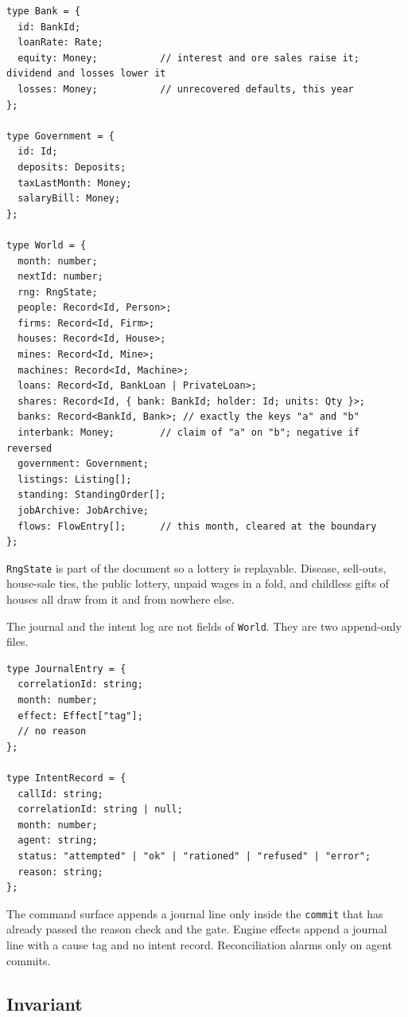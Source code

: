 \documentclass[11pt]{article}
\newenvironment{keep}{\noindent\begin{minipage}{\linewidth}}{\end{minipage}}
\begin{document}
\begin{keep}
\begin{lstlisting}
type Bank = {
  id: BankId;
  loanRate: Rate;
  equity: Money;           // interest and ore sales raise it; dividend and losses lower it
  losses: Money;           // unrecovered defaults, this year
};

type Government = {
  id: Id;
  deposits: Deposits;
  taxLastMonth: Money;
  salaryBill: Money;
};

type World = {
  month: number;
  nextId: number;
  rng: RngState;
  people: Record<Id, Person>;
  firms: Record<Id, Firm>;
  houses: Record<Id, House>;
  mines: Record<Id, Mine>;
  machines: Record<Id, Machine>;
  loans: Record<Id, BankLoan | PrivateLoan>;
  shares: Record<Id, { bank: BankId; holder: Id; units: Qty }>;
  banks: Record<BankId, Bank>; // exactly the keys "a" and "b"
  interbank: Money;        // claim of "a" on "b"; negative if reversed
  government: Government;
  listings: Listing[];
  standing: StandingOrder[];
  jobArchive: JobArchive;
  flows: FlowEntry[];      // this month, cleared at the boundary
};
\end{lstlisting}
\end{keep}

\texttt{RngState} is part of the document so a lottery is replayable.
Disease, sell-outs, house-sale ties, the public lottery, unpaid wages in a
fold, and childless gifts of houses all draw from it and from nowhere else.

The journal and the intent log are not fields of \texttt{World}. They are
two append-only files.

\begin{keep}
\begin{lstlisting}
type JournalEntry = {
  correlationId: string;
  month: number;
  effect: Effect["tag"];
  // no reason
};

type IntentRecord = {
  callId: string;
  correlationId: string | null;
  month: number;
  agent: string;
  status: "attempted" | "ok" | "rationed" | "refused" | "error";
  reason: string;
};
\end{lstlisting}
\end{keep}

The command surface appends a journal line only inside the \texttt{commit}
that has already passed the reason check and the gate. Engine effects append
a journal line with a cause tag and no intent record. Reconciliation alarms
only on agent commits.

\subsection{Invariant}
\end{document}
